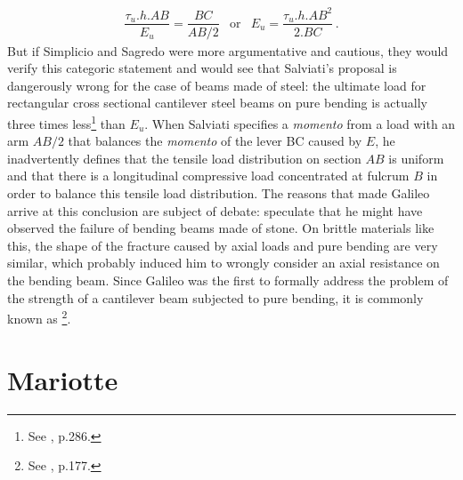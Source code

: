 \begin{eqnarray*}
\dfrac{\tau_u.h.AB}{E_u}=\dfrac{BC}{AB/2}&\text{or}&E_u=\dfrac{\tau_u.h.AB^2}{2.BC}\,.
\end{eqnarray*}
But if Simplicio and Sagredo were more argumentative and cautious, they would verify this categoric statement and would see that Salviati's proposal is dangerously wrong for the case of beams made of steel: the ultimate load for rectangular cross sectional cantilever steel beams on pure bending is actually three times less\footnote{See \cite{popov_1990_1}, p.286.} than $E_u$. When Salviati specifies a \emph{momento} from a load with an arm $AB/2$ that balances the \emph{momento} of the lever BC caused by $E$, he inadvertently defines that the tensile load distribution on section $AB$ is uniform and that there is a longitudinal compressive load concentrated at fulcrum $B$ in order to balance this tensile load distribution. The reasons that made Galileo arrive at this conclusion are subject of debate: \cite{higdon_1981_3} speculate that he might have observed the failure of bending beams made of stone. On brittle materials like this, the shape of the fracture caused by axial loads and pure bending are very similar, which probably induced him to wrongly consider an axial resistance on the bending beam. Since Galileo was the first to formally address the problem of the strength of a cantilever beam subjected to pure bending, it is commonly known as \footnote{See \cite{benvenuto_1991}, p.177.}. 

\section{Mariotte}

